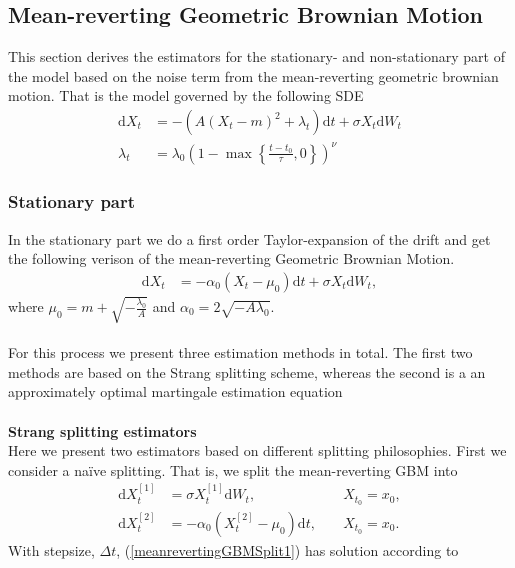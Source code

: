 \subsection{Mean-reverting Geometric Brownian Motion}\label{subsec:meanrevertingGBM}
This section derives the estimators for the stationary- and non-stationary part of the model based on the noise term from the mean-reverting geometric brownian motion. That is the model governed by the following SDE
\begin{align}
    \mathrm{d}X_t &= -\left(A\left(X_t - m\right)^2 + \lambda_t\right)\mathrm{d}t + \sigma X_t \mathrm{d}W_t\\
    \lambda_t &= \lambda_0\left(1 - \max\left\{\frac{t - t_0}{\tau}, 0\right\}\right)^\nu
\end{align}
\subsubsection{Stationary part}\label{subsubsec:meanrevertingGBMStationary}
In the stationary part we do a first order Taylor-expansion of the drift and get the following verison of the mean-reverting Geometric Brownian Motion.
\begin{align}
    \mathrm{d}X_t &= -\alpha_0\left(X_t - \mu_0\right)\mathrm{d}t + \sigma X_t \mathrm{d}W_t, \label{eq:GBM_simple}
\end{align}
where $\mu_0 = m + \sqrt{-\frac{\lambda_0}{A}}$ and $\alpha_0 = 2\sqrt{-A\lambda_0}$.\\\\
For this process we present three estimation methods in total. The first two methods are based on the Strang splitting scheme, whereas the second is a an approximately optimal martingale estimation equation \\\\
\noindent \textbf{Strang splitting estimators}\\
Here we present two estimators based on different splitting philosophies. First we consider a naïve splitting. That is, we split the mean-reverting GBM into
\begin{align}
    \mathrm{d}X_t^{[1]} &= \sigma X_t^{[1]}\mathrm{d}W_t, \; &&X_{t_0} = x_0, \label{meanrevertingGBMSplit1}\\
    \mathrm{d}X_t^{[2]} &= -\alpha_0\left(X_t^{[2]} - \mu_0\right)\mathrm{d}t, \; &&X_{t_0} = x_0. \label{meanrevertingGBMSplit2}
\end{align}
With stepsize, $\Delta t$, (\ref{meanrevertingGBMSplit1}) has solution according to \cite[example 4.7]{Srkk2019}
